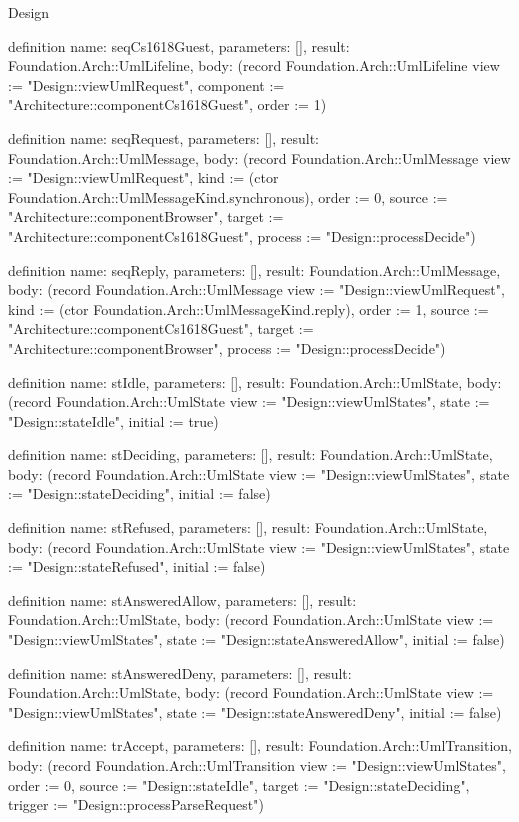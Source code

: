 \begin{lexlean}{Design}
\begin{semanticmodule}
definition{
  name: seqCs1618Guest,
  parameters: [],
  result: Foundation.Arch::UmlLifeline,
  body: (record Foundation.Arch::UmlLifeline {view := "Design::viewUmlRequest", component := "Architecture::componentCs1618Guest", order := 1})
}

definition{
  name: seqRequest,
  parameters: [],
  result: Foundation.Arch::UmlMessage,
  body: (record Foundation.Arch::UmlMessage {view := "Design::viewUmlRequest", kind := (ctor Foundation.Arch::UmlMessageKind.synchronous), order := 0, source := "Architecture::componentBrowser", target := "Architecture::componentCs1618Guest", process := "Design::processDecide"})
}

definition{
  name: seqReply,
  parameters: [],
  result: Foundation.Arch::UmlMessage,
  body: (record Foundation.Arch::UmlMessage {view := "Design::viewUmlRequest", kind := (ctor Foundation.Arch::UmlMessageKind.reply), order := 1, source := "Architecture::componentCs1618Guest", target := "Architecture::componentBrowser", process := "Design::processDecide"})
}

definition{
  name: stIdle,
  parameters: [],
  result: Foundation.Arch::UmlState,
  body: (record Foundation.Arch::UmlState {view := "Design::viewUmlStates", state := "Design::stateIdle", initial := true})
}

definition{
  name: stDeciding,
  parameters: [],
  result: Foundation.Arch::UmlState,
  body: (record Foundation.Arch::UmlState {view := "Design::viewUmlStates", state := "Design::stateDeciding", initial := false})
}

definition{
  name: stRefused,
  parameters: [],
  result: Foundation.Arch::UmlState,
  body: (record Foundation.Arch::UmlState {view := "Design::viewUmlStates", state := "Design::stateRefused", initial := false})
}

definition{
  name: stAnsweredAllow,
  parameters: [],
  result: Foundation.Arch::UmlState,
  body: (record Foundation.Arch::UmlState {view := "Design::viewUmlStates", state := "Design::stateAnsweredAllow", initial := false})
}

definition{
  name: stAnsweredDeny,
  parameters: [],
  result: Foundation.Arch::UmlState,
  body: (record Foundation.Arch::UmlState {view := "Design::viewUmlStates", state := "Design::stateAnsweredDeny", initial := false})
}

definition{
  name: trAccept,
  parameters: [],
  result: Foundation.Arch::UmlTransition,
  body: (record Foundation.Arch::UmlTransition {view := "Design::viewUmlStates", order := 0, source := "Design::stateIdle", target := "Design::stateDeciding", trigger := "Design::processParseRequest"})
}


\end{semanticmodule}
\end{lexlean}
